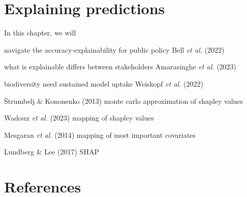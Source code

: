 \documentclass[
  letterpaper,
]{scrbook}
\begin{document}
\chapter{Explaining predictions}\label{sec-explanations}

In this chapter, we will

navigate the accuracy-explainability for public policy Bell \emph{et
al.} (2022)

what is explainable differs between stakeholders Amarasinghe \emph{et
al.} (2023)

biodiversity need sustained model uptake Weiskopf \emph{et al.} (2022)

Štrumbelj \& Kononenko (2013) monte carlo approximation of shapley
values

Wadoux \emph{et al.} (2023) mapping of shapley values

Mesgaran \emph{et al.} (2014) mapping of most important covariates

Lundberg \& Lee (2017) SHAP


\chapter*{References}\label{references}

\end{document}
